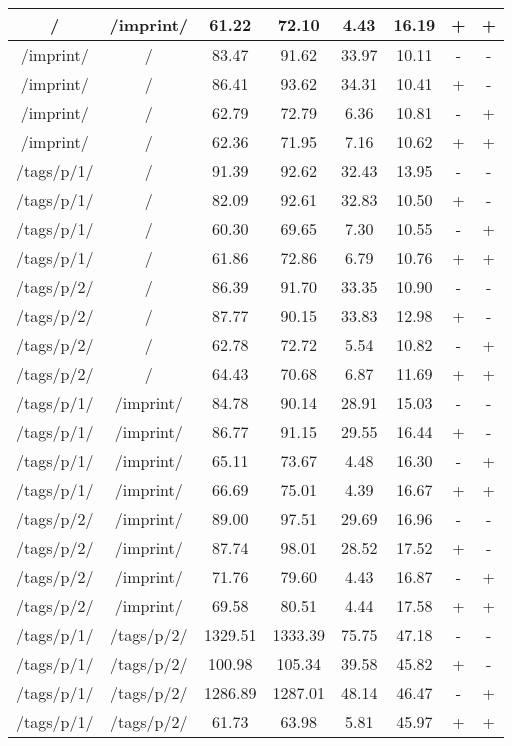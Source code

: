 \begin{appendix}
\begin{center}
\begin{longtable}{cccccccc}
/ & /imprint/ & 61.22 & 72.10 & 4.43 & 16.19 & + & + \\
\hline
/imprint/ & / & 83.47 & 91.62 & 33.97 & 10.11 & - & - \\
/imprint/ & / & 86.41 & 93.62 & 34.31 & 10.41 & + & - \\
/imprint/ & / & 62.79 & 72.79 & 6.36 & 10.81 & - & + \\
/imprint/ & / & 62.36 & 71.95 & 7.16 & 10.62 & + & + \\
\hline
\hline
/tags/p/1/ & / & 91.39 & 92.62 & 32.43 & 13.95 & - & - \\
/tags/p/1/ & / & 82.09 & 92.61 & 32.83 & 10.50 & + & - \\
/tags/p/1/ & / & 60.30 & 69.65 & 7.30 & 10.55 & - & + \\
/tags/p/1/ & / & 61.86 & 72.86 & 6.79 & 10.76 & + & + \\
\hline
/tags/p/2/ & / & 86.39 & 91.70 & 33.35 & 10.90 & - & - \\
/tags/p/2/ & / & 87.77 & 90.15 & 33.83 & 12.98 & + & - \\
/tags/p/2/ & / & 62.78 & 72.72 & 5.54 & 10.82 & - & + \\
/tags/p/2/ & / & 64.43 & 70.68 & 6.87 & 11.69 & + & + \\
\hline
/tags/p/1/ & /imprint/ & 84.78 & 90.14 & 28.91 & 15.03 & - & - \\
/tags/p/1/ & /imprint/ & 86.77 & 91.15 & 29.55 & 16.44 & + & - \\
/tags/p/1/ & /imprint/ & 65.11 & 73.67 & 4.48 & 16.30 & - & + \\
/tags/p/1/ & /imprint/ & 66.69 & 75.01 & 4.39 & 16.67 & + & + \\
\hline
/tags/p/2/ & /imprint/ & 89.00 & 97.51 & 29.69 & 16.96 & - & - \\
/tags/p/2/ & /imprint/ & 87.74 & 98.01 & 28.52 & 17.52 & + & - \\
/tags/p/2/ & /imprint/ & 71.76 & 79.60 & 4.43 & 16.87 & - & + \\
/tags/p/2/ & /imprint/ & 69.58 & 80.51 & 4.44 & 17.58 & + & + \\
\hline
\hline
/tags/p/1/ & /tags/p/2/ & 1329.51 & 1333.39 & 75.75 & 47.18 & - & - \\
/tags/p/1/ & /tags/p/2/ & 100.98 & 105.34 & 39.58 & 45.82 & + & - \\
/tags/p/1/ & /tags/p/2/ & 1286.89 & 1287.01 & 48.14 & 46.47 & - & + \\
/tags/p/1/ & /tags/p/2/ & 61.73 & 63.98 & 5.81 & 45.97 & + & + \\
\hline

\end{longtable}
\end{center}
\end{appendix}
